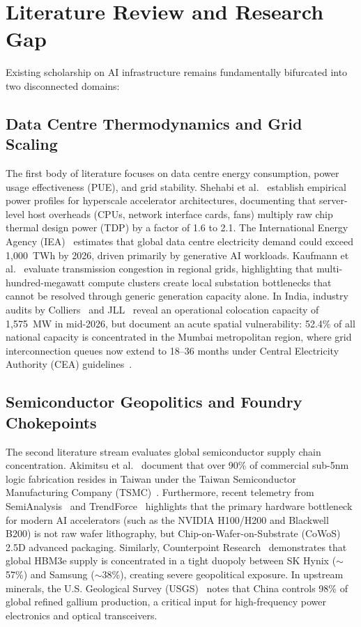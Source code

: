 \documentclass[conference]{IEEEtran}
\begin{document}
\section{Literature Review and Research Gap}
Existing scholarship on AI infrastructure remains fundamentally bifurcated into two disconnected domains:

\subsection{Data Centre Thermodynamics and Grid Scaling}
The first body of literature focuses on data centre energy consumption, power usage effectiveness (PUE), and grid stability. Shehabi et al.~\cite{shehabi2024lbnl} establish empirical power profiles for hyperscale accelerator architectures, documenting that server-level host overheads (CPUs, network interface cards, fans) multiply raw chip thermal design power (TDP) by a factor of 1.6 to 2.1. The International Energy Agency (IEA)~\cite{iea2024aienergy} estimates that global data centre electricity demand could exceed 1,000~TWh by 2026, driven primarily by generative AI workloads. Kaufmann et al.~\cite{kaufmann2025nature} evaluate transmission congestion in regional grids, highlighting that multi-hundred-megawatt compute clusters create local substation bottlenecks that cannot be resolved through generic generation capacity alone. In India, industry audits by Colliers~\cite{colliers2026dc} and JLL~\cite{jll2026india} reveal an operational colocation capacity of 1,575~MW in mid-2026, but document an acute spatial vulnerability: 52.4\% of all national capacity is concentrated in the Mumbai metropolitan region, where grid interconnection queues now extend to 18--36 months under Central Electricity Authority (CEA) guidelines~\cite{cea2026transmission}.

\subsection{Semiconductor Geopolitics and Foundry Chokepoints}
The second literature stream evaluates global semiconductor supply chain concentration. Akimitsu et al.~\cite{akimitsu2024cset} document that over 90\% of commercial sub-5nm logic fabrication resides in Taiwan under the Taiwan Semiconductor Manufacturing Company (TSMC)~\cite{tsmc2025telemetry}. Furthermore, recent telemetry from SemiAnalysis~\cite{semianalysis2025ai} and TrendForce~\cite{trendforce2025cowos} highlights that the primary hardware bottleneck for modern AI accelerators (such as the NVIDIA H100/H200 and Blackwell B200) is not raw wafer lithography, but Chip-on-Wafer-on-Substrate (CoWoS) 2.5D advanced packaging. Similarly, Counterpoint Research~\cite{counterpoint2025hbm} demonstrates that global HBM3e supply is concentrated in a tight duopoly between SK Hynix ($\sim$57\%) and Samsung ($\sim$38\%), creating severe geopolitical exposure. In upstream minerals, the U.S. Geological Survey (USGS)~\cite{usgs2025gallium} notes that China controls 98\% of global refined gallium production, a critical input for high-frequency power electronics and optical transceivers.
\end{document}
